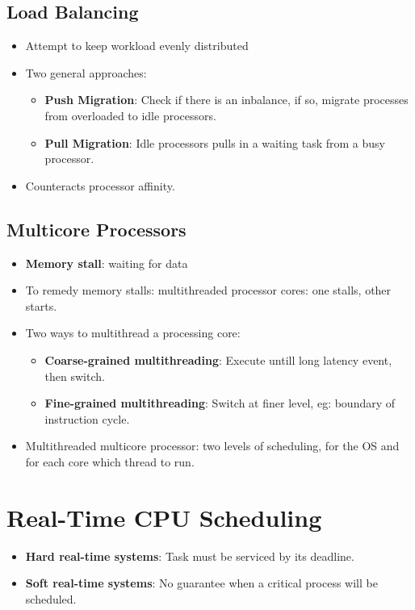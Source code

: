 \documentclass[10pt]{report}
\begin{document}
		\subsection{Load Balancing}
			\begin{itemize}
				\item Attempt to keep workload evenly distributed
				\item Two general approaches:
				\begin{itemize}
					\item \textbf{Push Migration}: Check if there is an inbalance, if so, migrate processes from overloaded to idle processors.
					\item \textbf{Pull Migration}: Idle processors pulls in a waiting task from a busy processor.
				\end{itemize}
				\item Counteracts processor affinity.
			\end{itemize}

		\subsection{Multicore Processors}
			\begin{itemize}
				\item \textbf{Memory stall}: waiting for data
				\item To remedy memory stalls: multithreaded processor cores: one stalls, other starts.
				\item Two ways to multithread a processing core:
				\begin{itemize}
					\item \textbf{Coarse-grained multithreading}: Execute untill long latency event, then switch.
					\item \textbf{Fine-grained multithreading}: Switch at finer level, eg: boundary of instruction cycle.
				\end{itemize}
				\item Multithreaded multicore processor: two levels of scheduling, for the OS and for each core which thread to run.
			\end{itemize}

	\section{Real-Time CPU Scheduling}
		\begin{itemize}
			\item \textbf{Hard real-time systems}: Task must be serviced by its deadline.
			\item \textbf{Soft real-time systems}: No guarantee when a critical process will be scheduled.
		\end{itemize}
\end{document}
